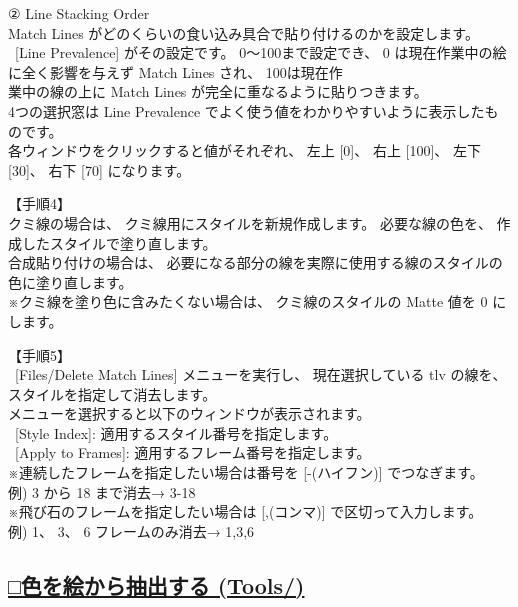 \documentclass[a4paper,10pt]{article}
\begin{document}
\small
\noindent ② Line Stacking Order\\
\footnotesize
Match Lines がどのくらいの食い込み具合で貼り付けるのかを設定します。\\
\ [Line Prevalence] がその設定です。 0～100まで設定でき、 0 は現在作業中の絵に全く影響を与えず Match Lines され、 100は現在作\\
業中の線の上に Match Lines が完全に重なるように貼りつきます。\\
4つの選択窓は Line Prevalence でよく使う値をわかりやすいように表示したものです。\\
各ウィンドウをクリックすると値がそれぞれ、 左上 [0]、 右上 [100]、 左下 [30]、 右下 [70] になります。\\[0.7em]
\par
\normalsize
\noindent 【手順4】\\
\footnotesize
クミ線の場合は、 クミ線用にスタイルを新規作成します。 必要な線の色を、 作成したスタイルで塗り直します。\\
合成貼り付けの場合は、 必要になる部分の線を実際に使用する線のスタイルの色に塗り直します。\\
※クミ線を塗り色に含みたくない場合は、 クミ線のスタイルの Matte 値を 0 にします。\\[0.7em]
\par
\normalsize
\noindent 【手順5】\\
\small
\ [Files/Delete Match Lines] メニューを実行し、 現在選択している tlv の線を、 スタイルを指定して消去します。\\
\footnotesize
メニューを選択すると以下のウィンドウが表示されます。\\
\ [Style Index]: 適用するスタイル番号を指定します。\\
\ [Apply to Frames]: 適用するフレーム番号を指定します。\\
※連続したフレームを指定したい場合は番号を [-(ハイフン)] でつなぎます。\\
例) 3 から 18 まで消去→ 3-18\\
※飛び石のフレームを指定したい場合は [,(コンマ)] で区切って入力します。\\
例) 1、 3、 6 フレームのみ消去→ 1,3,6

\newpage

\subsection*{\uline{□色を絵から抽出する (Tools/)}}
\end{document}
